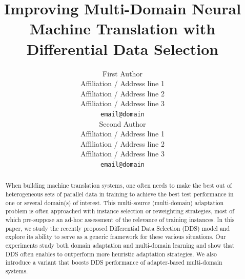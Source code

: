\documentclass[11pt,a4paper]{article}
\title{Improving Multi-Domain Neural Machine Translation with Differential Data Selection}
\author{First Author \\
  Affiliation / Address line 1 \\
  Affiliation / Address line 2 \\
  Affiliation / Address line 3 \\
  \texttt{email@domain} \\\And
  Second Author \\
  Affiliation / Address line 1 \\
  Affiliation / Address line 2 \\
  Affiliation / Address line 3 \\
  \texttt{email@domain} \\}
\date{}
\newcommand{\fyTodo}[1]{\Todo[FY:]{\textcolor{orange}{#1}}}
\begin{document}
\maketitle
\begin{abstract}
  When building machine translation systems, one often needs to make the best out of heterogeneous sets of parallel data in training to achieve the best test performance in one or several domain(s) of interest. This multi-source (multi-domain) adaptation problem is often approached with instance selection or reweighting strategies, most of which pre-suppose an ad-hoc assessment of the relevance of training instances. In this paper, we study the recently proposed Differential Data Selection (DDS) model and explore its ability to serve as a generic framework for these various situations. Our experiments study both domain adaptation and multi-domain learning and show that DDS often enables to outperform more heuristic adaptation strategies. We also introduce a variant that boosts DDS performance of adapter-based multi-domain systems.\fyTodo{Keep this part ?}

\end{abstract}
\end{document}
